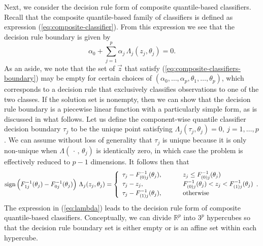 Next, we consider the decision rule form of composite quantile-based
classifiers.  Recall that the composite quantile-based family of classifiers is
defined as expression (\ref{eq:composite-classifier}).  From this expression we
see that the decision rule boundary is given by
\begin{equation}
  \label{eq:composite-classifiers-boundary}
  \alpha_0 + \sum_{j=1}^p \alpha_j\, \Lambda_j (z_j, \theta_j) = 0.
\end{equation}
As an aside, we note that the set of $\vec{z}$ that satisfy
(\ref{eq:composite-classifiers-boundary}) may be empty for certain choices of
$(\alpha_0, \dots, \alpha_p, \allowbreak\theta_1, \allowbreak\dots,
\allowbreak\theta_p)$, which corresponds to a decision rule that exclusively
classifies observations to one of the two classes.  If the solution set is
nonempty, then we can show that the decision rule boundary is a piecewise linear
function with a particularly simple form, as is discussed in what follows.  Let
us define the component-wise quantile classifier decision boundary $\tau_j$ to
be the unique point satisfying
$\Lambda_j (\tau_j, \theta_j) = 0,~ j = 1, \dots, p$.  We can assume without
loss of generality that $\tau_j$ is unique because it is only non-unique when
$\Lambda(\,\cdot\,,\, \theta_j)$ is identically zero, in which case the problem
is effectively reduced to $p - 1$ dimensions.  It follows then that
\begin{equation}
  \label{eq:lambda}
  \operatorname{sign}\Big(F_{1j}^{-1}(\theta_j) - F_{0j}^{-1}(\theta_j)\Big)~ \Lambda_j(z_j, \theta_j) =
  \left\{
    \begin{array}{lll}
      \tau_j - F_{(0)j}^{-1}(\theta_j),
      & \hspace{5mm}
      & z_j \leq F_{(0)j}^{-1}(\theta_j) \\[0.5ex]
      \tau_j - z_j,
      & \hspace{5mm}
      & F_{(0)j}^{-1}(\theta_j) < z_j < F_{(1)j}^{-1}(\theta_j) \\[0.5ex]
      \tau_j - F_{(1)j}^{-1} (\theta_j),
      & \hspace{5mm}
      & \text{otherwise} \\
    \end{array}.
  \right.
\end{equation}
The expression in (\ref{eq:lambda}) leads to the decision rule form of composite
quantile-based classifiers.  Conceptually, we can divide $\mathbb{R}^p$ into
$3^p$ hypercubes so that the decision rule boundary set is either empty or is an
affine set within each hypercube.


